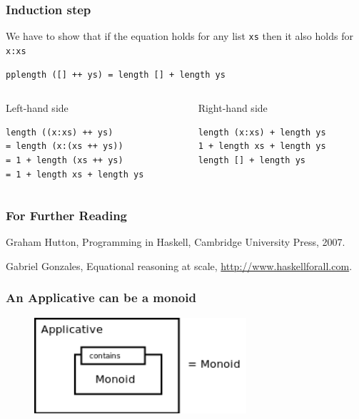 \documentclass{beamer}
\begin{document}
\begin{frame}[fragile]
\frametitle{Induction step}
We have to show that if the equation holds for any list \verb|xs| then it also holds for \verb|x:xs|
\begin{verbatim}
pplength ([] ++ ys) = length [] + length ys
\end{verbatim}
\begin{columns}
  \begin{column}{.5\textwidth}
    \begin{block}{Left-hand side}
      \begin{verbatim}
length ((x:xs) ++ ys)      
= length (x:(xs ++ ys))    
= 1 + length (xs ++ ys)    
= 1 + length xs + length ys
\end{verbatim}
    \end{block}
  \end{column}
  \begin{column}{.5\textwidth}
    \begin{block}{Right-hand side}
\begin{verbatim}
length (x:xs) + length ys
1 + length xs + length ys
length [] + length ys   
\end{verbatim}
    \end{block}
  \end{column}
\end{columns}

\end{frame}




\begin{frame}
  \frametitle{For Further Reading}

  \begin{thebibliography}{Subramaniam, 2011}

Graham Hutton,
Programming in Haskell,
Cambridge University Press,
2007.

Gabriel Gonzales,
Equational reasoning at scale, 
\url{http://www.haskellforall.com}.

\end{thebibliography}
\end{frame}

\appendix

\begin{frame}[fragile]
  \frametitle{An Applicative can be a monoid}
\begin{figure}
  \centering
     \includegraphics[width=0.7\textwidth]{monoid}
\end{figure}
\end{frame}
\end{document}
